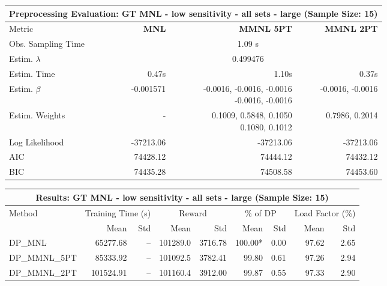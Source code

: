 
\begin{samepage}
\begin{center}
  \small
  \begin{tabular}{l|r|r|r}
    \toprule
    \multicolumn{4}{c}{\textbf{Preprocessing Evaluation: GT MNL - low sensitivity - all sets - large (Sample Size: 15)}} \\
    \midrule
    Metric & \textbf{MNL} & \textbf{MMNL 5PT} & \textbf{MMNL 2PT} \\
    \midrule
    Obs. Sampling Time & \multicolumn{3}{c}{1.09 s} \\
    Estim. $\lambda$ & \multicolumn{3}{c}{0.499476} \\
    Estim. Time & 0.47s & 1.10s & 0.37s \\
    Estim. $\beta$ & -0.001571 & \makecell[tr]{-0.0016, -0.0016, -0.0016 \\ -0.0016, -0.0016} & -0.0016, -0.0016 \\
    Estim. Weights & - & \makecell[tr]{0.1009, 0.5848, 0.1050 \\ 0.1080, 0.1012} & 0.7986, 0.2014 \\
    Log Likelihood & -37213.06 & -37213.06 & -37213.06 \\
    AIC & 74428.12 & 74444.12 & 74432.12 \\
    BIC & 74435.28 & 74508.58 & 74453.60 \\
    \bottomrule
  \end{tabular}
\end{center}
\begin{center}
  \small
  \begin{tabular}{l|rr|rr|rr|rr}
    \toprule
    \multicolumn{9}{c}{\textbf{Results: GT MNL - low sensitivity - all sets - large (Sample Size: 15)}} \\
    \midrule
    Method & \multicolumn{2}{c|}{Training Time (s)} & \multicolumn{2}{c|}{Reward} & \multicolumn{2}{c|}{\% of DP} & \multicolumn{2}{c}{Load Factor (\%)} \\
    & Mean & Std & Mean & Std & Mean & Std & Mean & Std \\
    \midrule
    DP\_MNL      & 65277.68 &    -- &   101289.0 &    3716.78 & 100.00* &    0.00 &   97.62 &    2.65 \\
    DP\_MMNL\_5PT & 85333.92 &    -- &   101092.5 &    3782.41 &   99.80 &    0.61 &   97.26 &    2.94 \\
    DP\_MMNL\_2PT & 101524.91 &    -- &   101160.4 &    3912.00 &   99.87 &    0.55 &   97.33 &    2.90 \\
    \midrule

\end{tabular}
\end{center}
\end{samepage}
